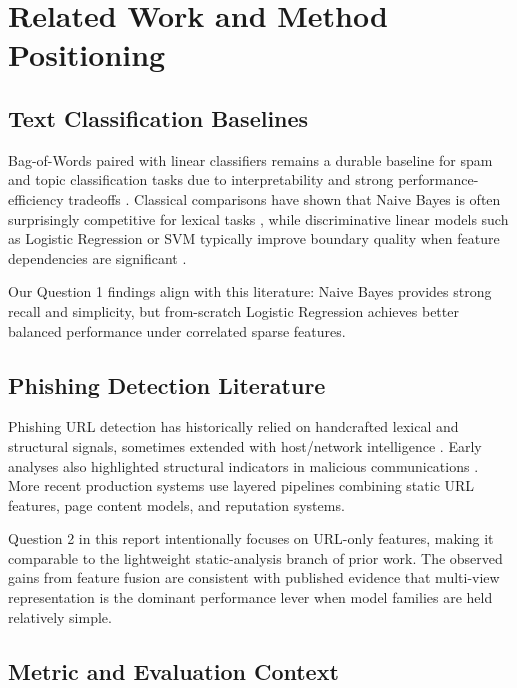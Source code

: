 \section{Related Work and Method Positioning}

\subsection{Text Classification Baselines}

Bag-of-Words paired with linear classifiers remains a durable baseline for spam and topic classification tasks due to interpretability and strong performance-efficiency tradeoffs \cite{manning2008introduction,jurafsky2023speech}. Classical comparisons have shown that Naive Bayes is often surprisingly competitive for lexical tasks \cite{mccallum1998comparison}, while discriminative linear models such as Logistic Regression or SVM typically improve boundary quality when feature dependencies are significant \cite{joachims1998text,hastie2009elements}.

Our Question 1 findings align with this literature: Naive Bayes provides strong recall and simplicity, but from-scratch Logistic Regression achieves better balanced performance under correlated sparse features.

\subsection{Phishing Detection Literature}

Phishing URL detection has historically relied on handcrafted lexical and structural signals, sometimes extended with host/network intelligence \cite{ma2011learning,aburrous2010intelligent}. Early analyses also highlighted structural indicators in malicious communications \cite{chandrasekaran2006phishing}. More recent production systems use layered pipelines combining static URL features, page content models, and reputation systems.

Question 2 in this report intentionally focuses on URL-only features, making it comparable to the lightweight static-analysis branch of prior work. The observed gains from feature fusion are consistent with published evidence that multi-view representation is the dominant performance lever when model families are held relatively simple.

\subsection{Metric and Evaluation Context}


